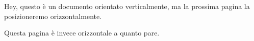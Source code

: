 \documentclass{article} %
\begin{document}
Hey, questo è un documento orientato verticalmente, ma la 
prossima pagina la posizioneremo orizzontalmente.
\newpage

\begin{landscape}
    Questa pagina è invece orizzontale a quanto pare.
\end{landscape}
\end{document}
